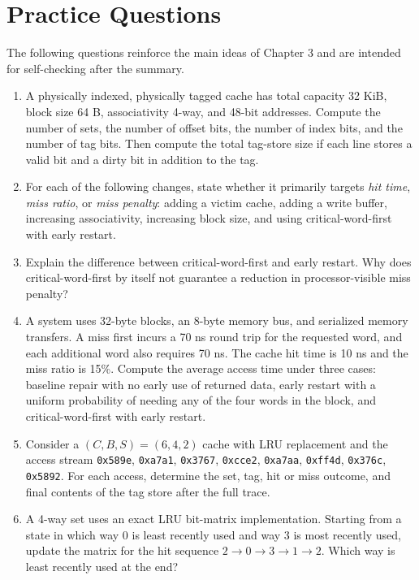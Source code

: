 \section{Practice Questions}\label{sec:ch3-practice}
The following questions reinforce the main ideas of Chapter 3 and are intended for self-checking after the summary.
\begin{enumerate}
    \item A physically indexed, physically tagged cache has total capacity 32 KiB, block size 64 B, associativity 4-way, and 48-bit addresses.
    Compute the number of sets, the number of offset bits, the number of index bits, and the number of tag bits.
    Then compute the total tag-store size if each line stores a valid bit and a dirty bit in addition to the tag.
    \item For each of the following changes, state whether it primarily targets \emph{hit time}, \emph{miss ratio}, or \emph{miss penalty}: adding a victim cache, adding a write buffer, increasing associativity, increasing block size, and using critical-word-first with early restart.
    \item Explain the difference between critical-word-first and early restart.
    Why does critical-word-first by itself not guarantee a reduction in processor-visible miss penalty?
    \item A system uses 32-byte blocks, an 8-byte memory bus, and serialized memory transfers.
    A miss first incurs a 70 ns round trip for the requested word, and each additional word also requires 70 ns.
    The cache hit time is 10 ns and the miss ratio is 15\%.
    Compute the average access time under three cases: baseline repair with no early use of returned data, early restart with a uniform probability of needing any of the four words in the block, and critical-word-first with early restart.
    \item Consider a $(C,B,S)=(6,4,2)$ cache with LRU replacement and the access stream \texttt{0x589e}, \texttt{0xa7a1}, \texttt{0x3767}, \texttt{0xcce2}, \texttt{0xa7aa}, \texttt{0xff4d}, \texttt{0x376c}, \texttt{0x5892}.
    For each access, determine the set, tag, hit or miss outcome, and final contents of the tag store after the full trace.
    \item A 4-way set uses an exact LRU bit-matrix implementation.
    Starting from a state in which way 0 is least recently used and way 3 is most recently used, update the matrix for the hit sequence $2\rightarrow 0\rightarrow 3\rightarrow 1\rightarrow 2$.
    Which way is least recently used at the end?

\end{enumerate}
